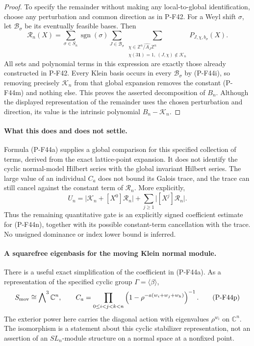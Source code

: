 \documentclass[11pt,a4paper]{article}
\begin{document}
\begin{proof}
To specify the remainder without making any local-to-global
identification, choose any perturbation and common direction
as in P-F42. For a Weyl shift $\sigma$, let
$\mathscr B_\sigma$ be its eventually feasible bases.
Then
\[
 \mathcal R_n(X)=
 \sum_{\sigma\in S_n}\operatorname{sgn}(\sigma)
 \sum_{J\in\mathscr B_\sigma}
 \sum_{\substack{\chi\in\widehat{\mathbb Z^n/A_J\mathbb Z^n}\\
                 \chi(3\mathbf1)=1,\ (J,\chi)\notin\mathscr K_n}}
              P_{J,\chi,b_\sigma}(X).
 \tag{P-F44n}
\]
All sets and polynomial terms in this expression are
exactly those already constructed in P-F42.
Every Klein basis occurs in every $\mathscr B_\sigma$
by (P-F44i), so removing precisely $\mathscr K_n$
from that global expansion removes the constant
(P-F44m) and nothing else.
This proves the asserted decomposition of $B_n$.
Although the displayed representation of the remainder
uses the chosen perturbation and direction, its value
is the intrinsic polynomial $B_n-\mathcal K_n$.
\end{proof}

\paragraph{What this does and does not settle.}
Formula (P-F44a) supplies a global comparison for this
specified collection of terms, derived from the exact
lattice-point expansion. It does not identify the cyclic
normal-model Hilbert series with the global invariant
Hilbert series.
The large value of an individual $C_a$ does not bound
its Galois trace, and the trace can still cancel against
the constant term of $\mathcal R_n$.
More explicitly,
\[
 U_n=
   \bigl|\mathcal K_n+[X^0]\mathcal R_n\bigr|
       +\sum_{j\ge1}\bigl|[X^j]\mathcal R_n\bigr|.
 \tag{P-F44o}
\]
Thus the remaining quantitative gate is an explicitly
signed coefficient estimate for (P-F44n), together with
its possible constant-term cancellation with the trace.
No unsigned dominance or index lower bound is inferred.

\paragraph{A squarefree eigenbasis for the moving Klein normal module.}
There is a useful exact simplification of the coefficient in
(P-F44a). As a representation of the specified cyclic group
$\Gamma=\langle\beta\rangle$,
\[
                  S_{\rm mov}\cong\bigwedge\nolimits^3\mathbb C^n,
 \qquad
 C_a=
 \prod_{0\le i<j<k<n}
       \left(1-\rho^{-a(w_i+w_j+w_k)}\right)^{-1}.
 \tag{P-F44p}
\]
The exterior power here carries the diagonal action with
eigenvalues $\rho^{w_i}$ on $\mathbb C^n$.
The isomorphism is a statement about this cyclic stabilizer
representation, not an assertion of an $SL_n$-module structure
on a normal space at a nonfixed point.
\end{document}
